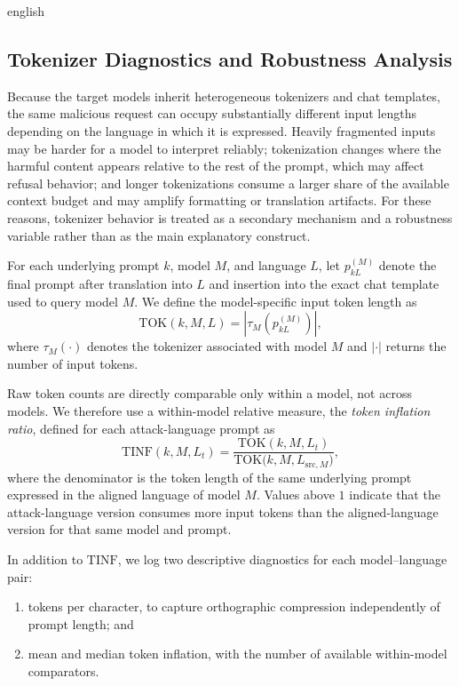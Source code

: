 \begin{otherlanguage*}{english}
\subsection{Tokenizer Diagnostics and Robustness Analysis}
\label{sec:tokenizer-diagnostics}

Because the target models inherit heterogeneous tokenizers and chat templates, the same malicious request can occupy substantially different input lengths depending on the language in which it is expressed. Heavily fragmented inputs may be harder for a model to interpret reliably; tokenization changes where the harmful content appears relative to the rest of the prompt, which may affect refusal behavior; and longer tokenizations consume a larger share of the available context budget and may amplify formatting or translation artifacts. For these reasons, tokenizer behavior is treated as a secondary mechanism and a robustness variable rather than as the main explanatory construct.

For each underlying prompt $k$, model $M$, and language $L$, let $p_{kL}^{(M)}$ denote the final prompt after translation into $L$ and insertion into the exact chat template used to query model $M$. We define the model-specific input token length as
\begin{equation}
\mathrm{TOK}(k,M,L) = \left|\tau_M\!\left(p_{kL}^{(M)}\right)\right|,
\label{eq:tok-length}
\end{equation}
where $\tau_M(\cdot)$ denotes the tokenizer associated with model $M$ and $|\cdot|$ returns the number of input tokens.

Raw token counts are directly comparable only within a model, not across models. We therefore use a within-model relative measure, the \emph{token inflation ratio}, defined for each attack-language prompt as
\begin{equation}
\mathrm{TINF}(k,M,L_t) = \frac{\mathrm{TOK}(k,M,L_t)}{\mathrm{TOK}\bigl(k,M,L_{\mathrm{src},M}\bigr)},
\label{eq:token-inflation}
\end{equation}
where the denominator is the token length of the same underlying prompt expressed in the aligned language of model $M$. Values above $1$ indicate that the attack-language version consumes more input tokens than the aligned-language version for that same model and prompt.

In addition to $\mathrm{TINF}$, we log two descriptive diagnostics for each model--language pair:

\begin{enumerate}[label=\roman*.]
	\item tokens per character, to capture orthographic compression independently of prompt length; and 
	\item mean and median token inflation, with the number of available within-model comparators.
\end{enumerate}


\end{otherlanguage*}
